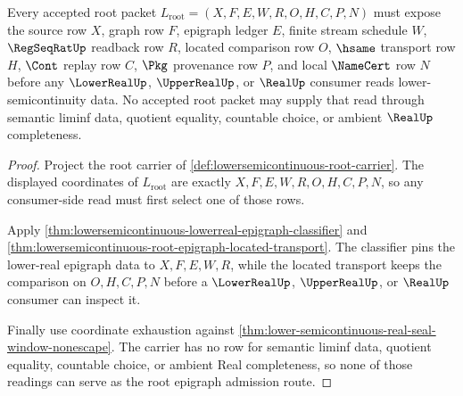\begin{theorem}
\label{thm:lowersemicontinuous-root-epigraph-carrier-admission}
Every accepted root packet
$L_{\mathrm{root}}=(X,F,E,W,R,O,H,C,P,N)$ must expose the source row $X$,
graph row $F$, epigraph ledger $E$, finite stream schedule $W$,
$\RegSeqRatUp$ readback row $R$, located comparison row $O$, $\hsame$
transport row $H$, $\Cont$ replay row $C$, $\Pkg$ provenance row $P$, and
local $\NameCert$ row $N$ before any $\LowerRealUp$, $\UpperRealUp$, or
$\RealUp$ consumer reads lower-semicontinuity data. No accepted root packet
may supply that read through semantic liminf data, quotient equality,
countable choice, or ambient $\RealUp$ completeness.
\end{theorem}
\begin{proof}
Project the root carrier of \autoref{def:lowersemicontinuous-root-carrier}.
The displayed coordinates of $L_{\mathrm{root}}$ are exactly
$X,F,E,W,R,O,H,C,P,N$, so any consumer-side read must first select one of
those rows.

Apply \autoref{thm:lowersemicontinuous-lowerreal-epigraph-classifier} and
\autoref{thm:lowersemicontinuous-root-epigraph-located-transport}. The
classifier pins the lower-real epigraph data to $X,F,E,W,R$, while the
located transport keeps the comparison on $O,H,C,P,N$ before a
$\LowerRealUp$, $\UpperRealUp$, or $\RealUp$ consumer can inspect it.

Finally use coordinate exhaustion against
\autoref{thm:lower-semicontinuous-real-seal-window-nonescape}. The carrier has
no row for semantic liminf data, quotient equality, countable choice, or
ambient Real completeness, so none of those readings can serve as the root
epigraph admission route.
\end{proof}

